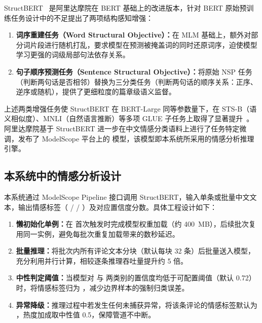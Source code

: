 StructBERT~\cite{wang2020structbert} 是阿里达摩院在 BERT 基础上的改进版本，针对 BERT 原始预训练任务设计中的不足提出了两项结构感知增强：

\begin{enumerate}
  \item \textbf{词序重建任务（Word Structural Objective）：}在 MLM 基础上，额外对部分词片段进行随机打乱，要求模型在预测被掩盖词的同时还原词序，迫使模型学习更强的词级局部句法依存关系。
  \item \textbf{句子顺序预测任务（Sentence Structural Objective）：}将原始 NSP 任务（判断两句话是否相邻）替换为三分类任务（判断两句话的顺序关系：正序、逆序或随机），提供了更细粒度的篇章级语义监督。
\end{enumerate}

上述两类增强任务使 StructBERT 在 BERT-Large 同等参数量下，在 STS-B（语义相似度）、MNLI（自然语言推断）等多项 GLUE 子任务上取得了显著提升~\cite{wang2020structbert}。阿里达摩院基于 StructBERT 进一步在中文情感分类语料上进行了任务特定微调，发布了 ModelScope 平台上的  模型，该模型即本系统所采用的情感分析推理引擎。

\subsection{本系统中的情感分析设计}

本系统通过 ModelScope Pipeline 接口调用 StructBERT，输入单条或批量中文文本，输出情感标签（ /  / ）及对应置信度分数。具体工程设计如下：

\begin{enumerate}
  \item \textbf{懒初始化单例：}在  首次触发时完成模型权重加载（约 400~MB），后续批次复用同一实例，避免每批次重复加载带来的数秒延迟。
  \item \textbf{批量推理：}将批次内所有评论文本分块（默认每块 32 条）后批量送入模型，充分利用并行计算，相较逐条推理吞吐量提升约 5 倍。
  \item \textbf{中性判定阈值：}当模型对  与  两类别的置信度均低于可配置阈值（默认 0.72）时，将情感标签归为 ，减少边界样本的强制归类误差。
  \item \textbf{异常降级：}推理过程中若发生任何未捕获异常，将该条评论的情感标签默认为 ，热度加成取中性值 0.5，保障管道不中断。
\end{enumerate}

